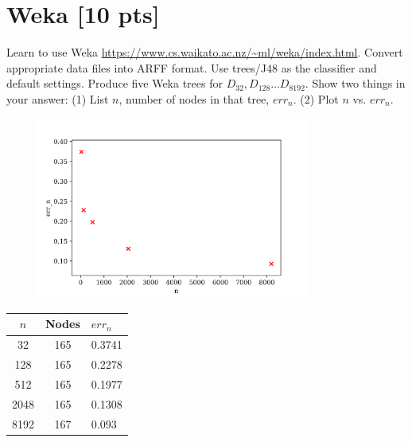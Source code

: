 \documentclass[a4paper]{article}
\theoremstyle{definition}
\begin{document}
\section{Weka [10 pts]}
Learn to use Weka \url{https://www.cs.waikato.ac.nz/~ml/weka/index.html}.
Convert appropriate data files into ARFF format.
Use trees/J48 as the classifier and default settings.
Produce five Weka trees for $D_{32}, D_{128} \ldots D_{8192}$.  
Show two things in your answer: (1) List $n$, number of nodes in that tree, $err_n$. (2) Plot $n$ vs. $err_n$.



   \begin{figure}[H]
	       \centering
	        \includegraphics[width=0.8\textwidth]{Ques3.png}
	       \captionsetup{labelformat=empty}
	     \caption{}
	       \label{fig:my_label}
	   \end{figure}
	   
\begin{table}[]
\color{blue}
\centering
\begin{tabular}{ccl}
\hline
$n$    & Nodes & $err_n$  \\ \hline
32   & 165     & 0.3741      \\
128  & 165     & 0.2278      \\
512  & 165     & 0.1977      \\
2048 & 165    & 0.1308 \\
8192 & 167   & 0.093  \\ \hline
\end{tabular}
\end{table}
	   

\end{document}
